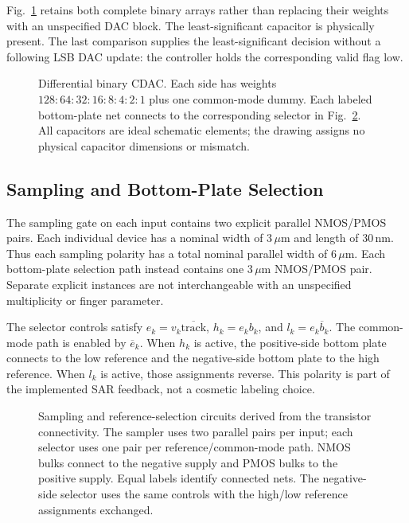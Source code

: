 \documentclass[10pt,conference,letterpaper]{IEEEtran}
\begin{document}
Fig.~\ref{fig:cdac} retains both complete binary arrays rather than replacing their weights with an unspecified DAC block. The least-significant capacitor is physically present. The last comparison supplies the least-significant decision without a following LSB DAC update: the controller holds the corresponding valid flag low.

\begin{figure}[!t]\centering
\resizebox{.95\textwidth}{!}{}
\caption{Differential binary CDAC. Each side has weights $128{:}64{:}32{:}16{:}8{:}4{:}2{:}1$ plus one common-mode dummy. Each labeled bottom-plate net connects to the corresponding selector in Fig.~\ref{fig:cdacswitch}. All capacitors are ideal schematic elements; the drawing assigns no physical capacitor dimensions or mismatch.}\label{fig:cdac}
\end{figure}

\subsection{Sampling and Bottom-Plate Selection}
The sampling gate on each input contains two explicit parallel NMOS/PMOS pairs. Each individual device has a nominal width of 3\,$\mu$m and length of 30\,nm. Thus each sampling polarity has a total nominal parallel width of 6\,$\mu$m. Each bottom-plate selection path instead contains one 3\,$\mu$m NMOS/PMOS pair. Separate explicit instances are not interchangeable with an unspecified multiplicity or finger parameter.

The selector controls satisfy $e_k=v_k\overline{\mathrm{track}}$, $h_k=e_kb_k$, and $l_k=e_k\overline b_k$. The common-mode path is enabled by $\overline e_k$. When $h_k$ is active, the positive-side bottom plate connects to the low reference and the negative-side bottom plate to the high reference. When $l_k$ is active, those assignments reverse. This polarity is part of the implemented SAR feedback, not a cosmetic labeling choice.

\begin{figure}[!t]\centering
\resizebox{.95\textwidth}{!}{}
\caption{Sampling and reference-selection circuits derived from the transistor connectivity. The sampler uses two parallel pairs per input; each selector uses one pair per reference/common-mode path. NMOS bulks connect to the negative supply and PMOS bulks to the positive supply. Equal labels identify connected nets. The negative-side selector uses the same controls with the high/low reference assignments exchanged.}\label{fig:cdacswitch}
\end{figure}
\end{document}
